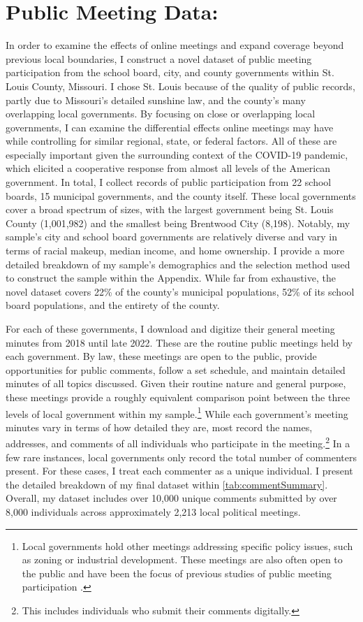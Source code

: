     \section{Public Meeting Data:}
    In order to examine the effects of online meetings and expand coverage beyond previous local boundaries, I construct a novel dataset of public meeting participation from the school board, city, and county governments within St. Louis County, Missouri. I chose St. Louis because of the quality of public records, partly due to Missouri's detailed sunshine law, and the county's many overlapping local governments. By focusing on close or overlapping local governments, I can examine the differential effects online meetings may have while controlling for similar regional, state, or federal factors. All of these are especially important given the surrounding context of the COVID-19 pandemic, which elicited a cooperative response from almost all levels of the American government. In total, I collect records of public participation from 22 school boards, 15 municipal governments, and the county itself. These local governments cover a broad spectrum of sizes, with the largest government being St. Louis County (1,001,982) and the smallest being Brentwood City (8,198). Notably, my sample's city and school board governments are relatively diverse and vary in terms of racial makeup, median income, and home ownership. I provide a more detailed breakdown of my sample's demographics and the selection method used to construct the sample within the Appendix. While far from exhaustive, the novel dataset covers 22\% of the county's municipal populations, 52\% of its school board populations, and the entirety of the county.

    

    For each of these governments, I download and digitize their general meeting minutes from 2018 until late 2022. These are the routine public meetings held by each government. By law, these meetings are open to the public, provide opportunities for public comments, follow a set schedule, and maintain detailed minutes of all topics discussed. Given their routine nature and general purpose, these meetings provide a roughly equivalent comparison point between the three levels of local government within my sample.\footnote{Local governments hold other meetings addressing specific policy issues, such as zoning or industrial development. These meetings are also often open to the public and have been the focus of previous studies of public meeting participation \citep[see][]{einsteinWhoParticipatesLocal2019}.} While each government's meeting minutes vary in terms of how detailed they are, most record the names, addresses, and comments of all individuals who participate in the meeting.\footnote{This includes individuals who submit their comments digitally.} In a few rare instances, local governments only record the total number of commenters present. For these cases, I treat each commenter as a unique individual. I present the detailed breakdown of my final dataset within \autoref{tab:commentSummary}. Overall, my dataset includes over 10,000 unique comments submitted by over 8,000 individuals across approximately 2,213 local political meetings.

